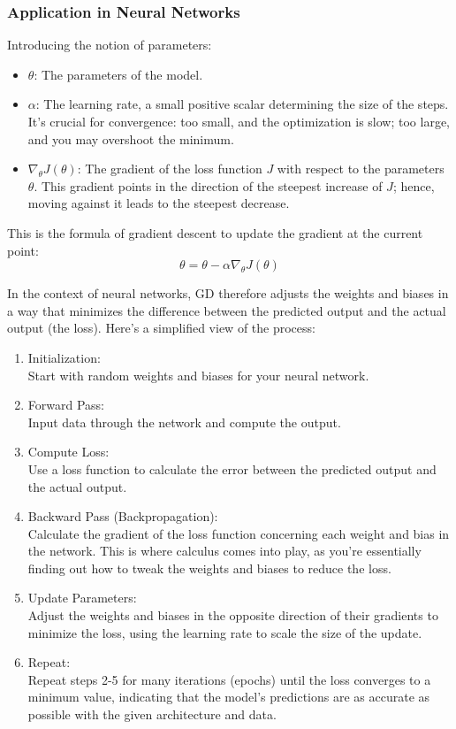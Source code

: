 \documentclass[journal]{IEEEtran}
\begin{document}
\subsubsection{Application in Neural Networks}
Introducing the notion of parameters:
\begin{itemize}
    \item \( \theta \): The parameters of the model.
    \item \( \alpha \): The learning rate, a small positive scalar determining the size of the steps. It's crucial for convergence: too small, and the optimization is slow; too large, and you may overshoot the minimum.
    \item \( \nabla_\theta J(\theta) \): The gradient of the loss function \( J \) with respect to the parameters \( \theta \). This gradient points in the direction of the steepest increase of \( J \); hence, moving against it leads to the steepest decrease.
\end{itemize}
This is the formula of gradient descent to update the gradient at the current point:
\[ \theta = \theta - \alpha \nabla_\theta J(\theta) \]

In the context of neural networks, GD therefore adjusts the weights and biases in a way that minimizes the difference between the predicted output and the actual output (the loss). Here's a simplified view of the process:
\begin{enumerate}
    \item  Initialization:\\
    Start with random weights and biases for your neural network.
    \item  Forward Pass: \\
    Input data through the network and compute the output.
    \item  Compute Loss: \\
    Use a loss function to calculate the error between the predicted output and the actual output.
    \item  Backward Pass (Backpropagation):\\
    Calculate the gradient of the loss function concerning each weight and bias in the network. This is where calculus comes into play, as you're essentially finding out how to tweak the weights and biases to reduce the loss.
    \item  Update Parameters:\\
    Adjust the weights and biases in the opposite direction of their gradients to minimize the loss, using the learning rate to scale the size of the update.
    \item  Repeat: \\
    Repeat steps 2-5 for many iterations (epochs) until the loss converges to a minimum value, indicating that the model's predictions are as accurate as possible with the given architecture and data.
\end{enumerate}
\end{document}
